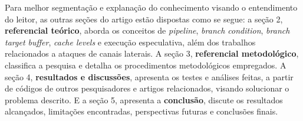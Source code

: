 \documentclass[
	article,			    %
	12pt,				    %
	oneside,			    %
	a4paper,			    %
	chapter=TITLE,		    %
	section=TITLE,		    %
	subsection=TITLE,	    %
	english,			    %
	brazil,				    %
	sumario=tradicional
]{abntex2}
\begin{document}
Para melhor segmentação e explanação do conhecimento visando o entendimento do leitor, as outras seções do artigo estão dispostas como se segue: a seção 2, \textbf{referencial teórico}, aborda os conceitos de \emph{pipeline}, \emph{branch condition}, \emph{branch target buffer}, \emph{cache levels} e execução especulativa, além dos trabalhos relacionados a ataques de canais laterais. A seção 3, \textbf{referencial metodológico}, classifica a pesquisa e detalha os procedimentos metodológicos empregados. A seção 4, \textbf{resultados e discussões}, apresenta os testes e análises feitas, a partir de códigos de outros pesquisadores e artigos relacionados, visando solucionar o problema descrito. E a seção 5, apresenta a \textbf{conclusão}, discute os resultados alcançados, limitações encontradas, perspectivas futuras e conclusões finais.
\end{document}
